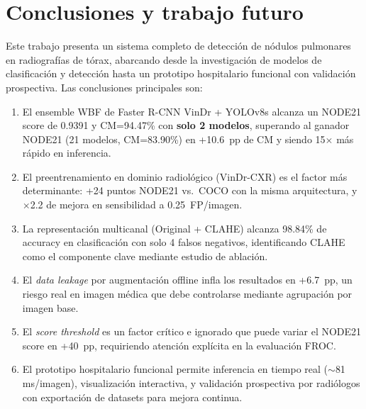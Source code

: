 \documentclass[conference]{IEEEtran}
\begin{document}
\section{Conclusiones y trabajo futuro}

Este trabajo presenta un sistema completo de detecci\'{o}n de n\'{o}dulos
pulmonares en radiograf\'{i}as de t\'{o}rax, abarcando desde la
investigaci\'{o}n de modelos de clasificaci\'{o}n y detecci\'{o}n hasta un
prototipo hospitalario funcional con validaci\'{o}n prospectiva. Las
conclusiones principales son:

\begin{enumerate}
\item El ensemble WBF de Faster R-CNN VinDr + YOLOv8s alcanza un NODE21 score de
0.9391 y CM=94.47\% con \textbf{solo 2 modelos}, superando al ganador NODE21
(21 modelos, CM=83.90\%) en +10.6~pp de CM y siendo 15$\times$ m\'{a}s
r\'{a}pido en inferencia.
\item El preentrenamiento en dominio radiol\'{o}gico (VinDr-CXR) es el factor
m\'{a}s determinante: +24 puntos NODE21 vs.\ COCO con la misma arquitectura,
y $\times$2.2 de mejora en sensibilidad a 0.25~FP/imagen.
\item La representaci\'{o}n multicanal (Original + CLAHE) alcanza 98.84\% de
accuracy en clasificaci\'{o}n con solo 4 falsos negativos, identificando CLAHE
como el componente clave mediante estudio de ablaci\'{o}n.
\item El \textit{data leakage} por augmentaci\'{o}n offline infla los
resultados en +6.7~pp, un riesgo real en imagen m\'{e}dica que debe controlarse
mediante agrupaci\'{o}n por imagen base.
\item El \textit{score threshold} es un factor cr\'{i}tico e ignorado que puede
variar el NODE21 score en +40~pp, requiriendo atenci\'{o}n expl\'{i}cita en la
evaluaci\'{o}n FROC.
\item El prototipo hospitalario funcional permite inferencia en tiempo real
($\sim$81\,ms/imagen), visualizaci\'{o}n interactiva, y validaci\'{o}n
prospectiva por radi\'{o}logos con exportaci\'{o}n de datasets para mejora
continua.
\end{enumerate}
\end{document}
